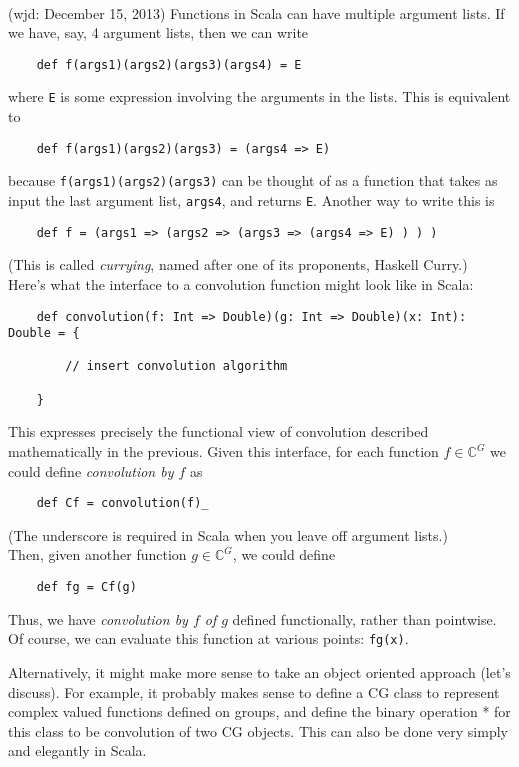 \documentclass[11pt]{article}
\newcommand\C{\ensuremath{\mathbb{C}}}
\begin{document}
\\[5pt]  (wjd: December 15, 2013)
Functions in Scala can have multiple argument lists. If we have, say, 4
argument lists, then we can write
{\small
\begin{verbatim}
    def f(args1)(args2)(args3)(args4) = E
\end{verbatim}}
\noindent where {\tt E} is some expression involving the arguments in the lists.
This is equivalent to
{\small
\begin{verbatim}
    def f(args1)(args2)(args3) = (args4 => E)
\end{verbatim}}
\noindent because {\tt f(args1)(args2)(args3)} can be thought of as a function that takes
as input the last argument list, {\tt args4}, and returns {\tt E}.
Another way to write this is
{\small
\begin{verbatim}
    def f = (args1 => (args2 => (args3 => (args4 => E) ) ) )
\end{verbatim}}
\noindent (This is called \emph{currying}, named after one of its proponents, Haskell Curry.)
\\[5pt]  
Here's what the interface to a convolution function might look like in Scala:
{\small
\begin{verbatim}
    def convolution(f: Int => Double)(g: Int => Double)(x: Int): Double = {

        // insert convolution algorithm

    }
\end{verbatim}}
\noindent This expresses precisely the functional view of convolution
described mathematically in the previous.  Given this interface, for each 
function $f \in \C^G$ we could define \emph{convolution by $f$} as
{\small
\begin{verbatim}
    def Cf = convolution(f)_
\end{verbatim}}
\noindent (The underscore is required in Scala when you leave off argument
lists.) 
\\[5pt]  
Then, given another function $g \in \C^G$, we could define
{\small
\begin{verbatim}
    def fg = Cf(g)
\end{verbatim}
}  
\noindent Thus, we have 
\emph{convolution by $f$ of $g$} defined functionally, rather than pointwise.
Of course, we can evaluate this function at various points: {\tt fg(x)}.

Alternatively, it might make more sense to take an object oriented approach (let's
discuss).  For example, it probably makes sense to define a CG class to
represent complex valued functions defined on groups, and define the binary
operation * for this class to be convolution of two CG objects.  This can also
be done very simply and elegantly in Scala. 
\end{document}
